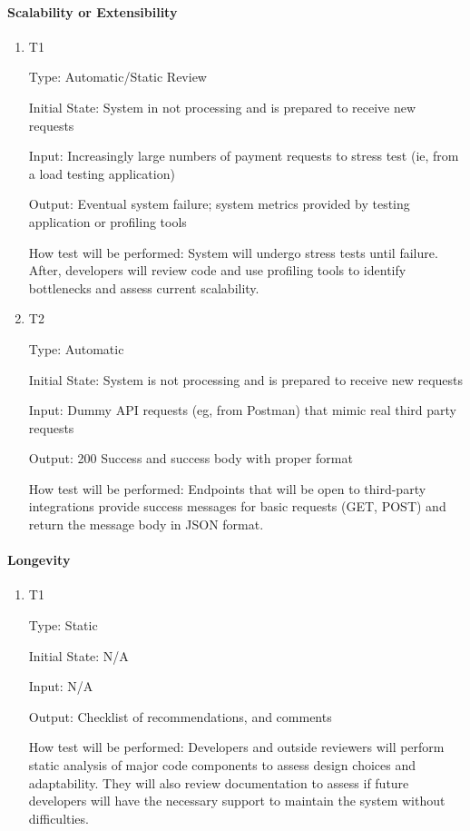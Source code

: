 \documentclass[12pt, titlepage]{article}
\begin{document}
\paragraph{Scalability or Extensibility}

\begin{enumerate}
\item{T1\\}

Type: Automatic/Static Review

Initial State: System in not processing and is prepared to receive new requests

Input: Increasingly large numbers of payment requests to stress test (ie, from a load testing application)

Output: Eventual system failure; system metrics provided by testing application or profiling tools

How test will be performed: System will undergo stress tests until failure. After, developers will review code and use profiling tools to identify bottlenecks and assess current scalability.

\item{T2\\}

Type: Automatic

Initial State: System is not processing and is prepared to receive new requests

Input: Dummy API requests (eg, from Postman) that mimic real third party requests

Output: 200 Success and success body with proper format

How test will be performed: Endpoints that will be open to third-party integrations provide success messages for basic requests (GET, POST) and return the message body in JSON format.

\end{enumerate}

\paragraph{Longevity}

\begin{enumerate}

\item{T1\\}

Type: Static

Initial State: N/A

Input: N/A

Output: Checklist of recommendations, and comments

How test will be performed: Developers and outside reviewers will perform static analysis of major code components to assess design choices and adaptability. They will also review documentation to assess if future developers will have the necessary support to maintain the system without difficulties.

\end{enumerate}
\end{document}
